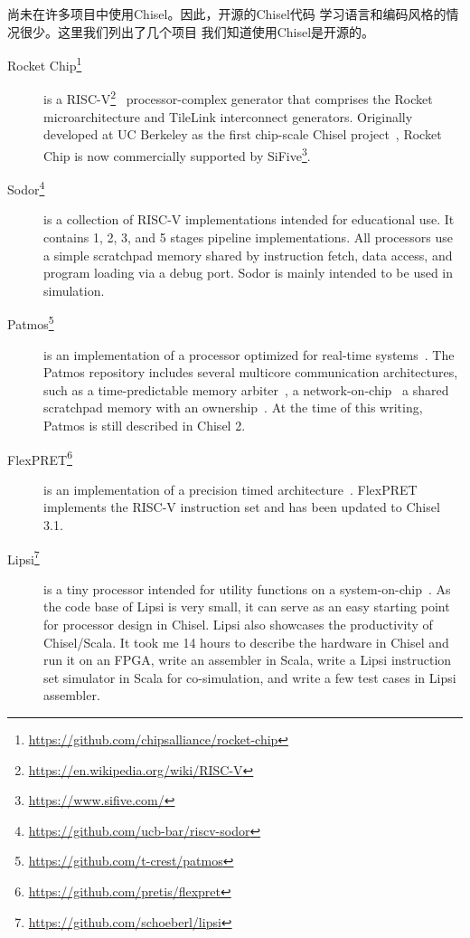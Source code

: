 \documentclass[%
    10pt,
    headinclude, footexclude,
    openright, %
    notitlepage,
    cleardoubleempty,
    headsepline,
    pointlessnumbers,
    bibtotoc, idxtotoc,
    ]{scrbook}
\newcommand{\myref}[2]{\href{#1}{#2}}
\renewcommand{\myref}[2]{{#2}{\footnote{\url{#1}}}}
\begin{document}
{尚未在许多项目中使用Chisel。因此，开源的Chisel代码
学习语言和编码风格的情况很少。这里我们列出了几个项目
我们知道使用Chisel是开源的。

\begin{description}

\item[\myref{https://github.com/chipsalliance/rocket-chip}{Rocket Chip}]
is a \myref{https://en.wikipedia.org/wiki/RISC-V}{RISC-V}~\cite{risc-v}
processor-complex generator that comprises the Rocket
microarchitecture and TileLink interconnect generators.  Originally developed
at UC Berkeley as the first chip-scale Chisel project~\cite{rocket:techrep}, Rocket Chip is now
commercially supported by \myref{https://www.sifive.com/}{SiFive}.

\item[\myref{https://github.com/ucb-bar/riscv-sodor}{Sodor}] is a collection of RISC-V
implementations intended for educational use. It contains 1, 2, 3, and 5 stages pipeline
implementations. All processors use a simple scratchpad memory shared by instruction
fetch, data access, and program loading via a debug port. Sodor is mainly intended to
be used in simulation.

\item[\myref{https://github.com/t-crest/patmos}{Patmos}] is an implementation of a
processor optimized for real-time systems~\cite{patmos:rts2018}. The Patmos repository
includes several multicore communication architectures, such as a time-predictable memory
arbiter~\cite{t-crest:memnoc}, a network-on-chip~\cite{s4nocni:arcs2019}
a shared scratchpad memory with an ownership~\cite{t-crest:ownspm}.
At the time of this writing, Patmos is still described in Chisel 2.

\item[\myref{https://github.com/pretis/flexpret}{FlexPRET}] is an implementation of a
precision timed architecture~\cite{Zimmer:EECS-2015-181}. FlexPRET implements
the RISC-V instruction set and has been updated to Chisel 3.1.

\item[\myref{https://github.com/schoeberl/lipsi}{Lipsi}] is a tiny processor intended
for utility functions on a system-on-chip~\cite{lipsi:arcs2018}. As the code base of
Lipsi is very small, it can serve as an easy starting point for processor design in Chisel.
Lipsi also showcases the productivity of Chisel/Scala. It took me 14 hours to describe the
hardware in Chisel and run it on an FPGA, write an assembler in Scala, write a
Lipsi instruction set simulator in Scala for co-simulation, and write a few test cases
in Lipsi assembler.


\end{description}}
\end{document}
